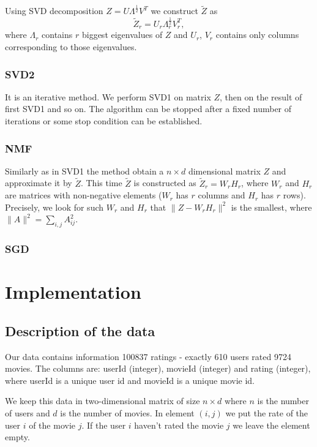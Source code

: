 \documentclass[11pt]{amsart}
\begin{document}
Using SVD decomposition $Z = U \Lambda^{\frac{1}{2}} V^T$ we construct $\tilde{Z}$ as
\[\tilde{Z}_r = U_r \Lambda_r^{\frac{1}{2}}V_r^T,\]
where $\Lambda_r$ contains $r$ biggest eigenvalues of $Z$ and $U_r$, $V_r$ contains only columns corresponding to those eigenvalues.

\subsubsection*{SVD2}

It is an iterative method.
We perform SVD1 on matrix $Z$, then on the result of first SVD1 and so on.
The algorithm can be stopped after a fixed number of iterations or some stop condition can be established.


\subsubsection*{NMF}

Similarly as in SVD1 the method obtain a $n \times d$ dimensional matrix $Z$ and approximate it by $\tilde{Z}$.
This time $\tilde{Z}$ is constructed as $\tilde{Z}_r = W_r H_r $, where $W_r$ and $H_r$ are matrices with non-negative elements ($W_r$ has $r$ columns and $H_r$ has $r$ rows).
Precisely, we look for such $W_r$ and $H_r$ that $\|Z - W_r H_r \|^2$ is the smallest, where $\|A\|^2 = \sum_{i, j} A_{ij}^2$.

\subsubsection*{SGD}


\section{Implementation}

\subsection*{Description of the data}

Our data contains information 100837 ratings - exactly 610 users rated 9724 movies.
The columns are: \textsf{userId} (integer), \textsf{movieId} (integer) and \textsf{rating} (integer), where \textsf{userId} is a unique user id and \textsf{movieId} is a unique movie id.


We keep this data in two-dimensional matrix of size $n \times d$ where $n$ is the number of users and $d$ is the number of movies.
In element $(i,j)$ we put the rate of the user $i$ of the movie $j$.
If the user $i$ haven't rated the movie $j$ we leave the element empty.
\end{document}
